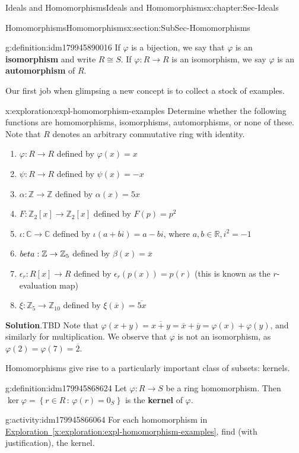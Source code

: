 \documentclass[oneside,10pt,]{book}
\newcommand{\blocktitlefont}{\relax}
\newcommand{\xreffont}{\relax}
\newcommand{\terminology}[1]{\textbf{#1}}
\numberwithin{equation}{section}
\def\p{\varphi}
\newcommand{\setof}[2]{{\left\{#1\,\colon\,#2\right\}}}
\def\C{{\mathbb C}}
\def\Z{{\mathbb Z}}
\def\R{{\mathbb R}}
\begin{document}
\begin{chapterptx}{Ideals and Homomorphisms}{}{Ideals and Homomorphisms}{}{}{x:chapter:Sec-Ideals}
\begin{sectionptx}{Homomorphisms}{}{Homomorphisms}{}{}{x:section:SubSec-Homomorphisms}
\begin{definition}{}{g:definition:idm179945890016}
If \(\p\) is a bijection, we say that \(\p\) is an \terminology{isomorphism} and write \(R\cong S\). If \(\p : R\to R\) is an isomorphism, we say \(\p\) is an \terminology{automorphism} of \(R\).%
\end{definition}
Our first job when glimpsing a new concept is to collect a stock of examples.%
\begin{exploration}{}{x:exploration:expl-homomorphism-examples}%
Determine whether the following functions are homomorphisms, isomorphisms, automorphisms, or none of these. Note that \(R\) denotes an arbitrary commutative ring with identity.%
%
\begin{enumerate}
\item{}\(\p : R\to R\) defined by \(\p(x)=x\)%
\item{}\(\psi : R\to R\) defined by \(\psi(x)=-x\)%
\item{}\(\alpha : \Z\to \Z\) defined by \(\alpha(x)=5x\)%
\item{}\(F : \Z_2[x]\to \Z_2[x]\) defined by \(F(p) = p^2\)%
\item{}\(\iota : \C\to \C\) defined by \(\iota(a+bi)=a-bi\), where \(a,b\in \R, i^2 = -1\)%
\item{}\(\\beta : \Z\to \Z_{5}\) defined by \(\beta(x) = \overline{x}\)%
\item{}\(\epsilon_r : R[x] \to R\) defined by \(\epsilon_r(p(x)) = p(r)\) (this is known as the \(r\)-evaluation map)%
\item{}\(\xi : \Z_5 \to \Z_{10}\) defined by \(\xi(\overline{x}) = \overline{5x}\)%
\end{enumerate}
\par\smallskip%
\noindent\textbf{\blocktitlefont Solution}.\hypertarget{g:solution:idm179945871312}{}\quad{}TBD Note that \(\p(x+y) = \overline{x+y} = \overline{x} + \overline{y} = \p(x) + \p(y)\), and similarly for multiplication. We observe that \(\p\) is not an isomorphism, as \(\p(2) = \p(7) = \overline{2}\).%
\end{exploration}
Homomorphisms give rise to a particularly important class of subsets: kernels.%
\begin{definition}{}{g:definition:idm179945868624}%
Let \(\p : R \to S\) be a ring homomorphism. Then \(\ker \p =\setof{r\in R}{\p(r)=0_S}\) is the \terminology{kernel} of \(\p\).%
\end{definition}
\begin{activity}{}{g:activity:idm179945866064}%
For each homomorphism in \hyperref[x:exploration:expl-homomorphism-examples]{Exploration~{\xreffont\ref{x:exploration:expl-homomorphism-examples}}}, find (with justification), the kernel.%

\end{activity}
\end{sectionptx}
\end{chapterptx}
\end{document}
